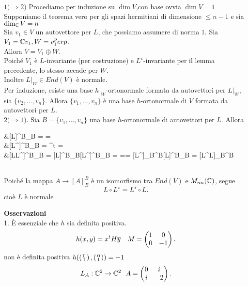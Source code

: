 \documentclass[12px]{article}
\begin{document}
	\begin{dimo}
		$1) \Rightarrow  2)$ Procediamo per induzione su $\dim V$,con base ovvia $\dim V = 1$ \\
		Supponiamo il teorema vero per gli spazi hermitiani di dimensione $\leq n-1$ e sia  $\dim_{\mathbb{C}} V = n$\\
		Sia  $v_1\in V$ un autovettore per $L$, che possiamo assumere di norma  $1$. Sia $V_1 = \mathbb{C} v_1, W = v_1^perp$.\\
		Allora $V = V_1 \oplus W$.\\
		Poiché $V_1$ è $L$-invariante (per costruzione) e $L^\star$-invariante per il lemma precedente, lo stesso accade per  $W$.\\
		Inoltre $L|_W\in End(V)$ è normale.\\
		Per induzione, esiste una base $h|_W$-ortonormale formata da autovettori per $L|_W$, sia $\{v_2,\ldots,v_n\}.$ Allora $\{v_1,\ldots,v_n\}$ è una base $h$-ortonormale di $V$ formata da autovettori per $L$.\\
		$2) \Rightarrow 1)$. Sia $B = \{v_1,\ldots,v_n\}$ una base $h$-ortonormale di autovettori per $L$. Allora\\
		\begin{aligned}
			\hspace{80px}&[L]^B_B = \bigwedge = \\
			    &[L^\star]^B_B = ^t = \overline{\bigwedge}\\
			    &[L\circ L^\star]^B_B = [L]^B_B[L^\star]^B_B = \bigwedge\overline{\bigwedge}=\overline{\bigwedge}\bigwedge = [L^\star]_B^B[L]^B_B = [L^\star \circ L]_B^B
		 \end{aligned} \\
		 Poiché la mappa $A \rightarrow [A]^B_B$ è un isomorfismo tra
		 $End(V)$ e $M_{nn}(\mathbb{C})$, segue 
		 \[
		 L\circ L^\star = L^\star \circ L
		 .\] 
		 cioè $L$ è normale
	\end{dimo}
	\textbf{Osservazioni}\\
	1. È essenziale che $h$ sia definita positiva.\\
	\[
	 h(x,y) = x^tH\overline{y} \ \ \ M = \begin{pmatrix}1&0\\0&-1\end{pmatrix}
	.\] 
	non è definita positiva $h(\left(\begin{smallmatrix}0\\1\end{smallmatrix}\right),\left(\begin{smallmatrix}0\\1\end{smallmatrix}\right)) = -1$
	\[
		L_A:\mathbb{C}^2 \rightarrow\mathbb{C}^2 \ \ A = \begin{pmatrix}0&i\\i & -2\end{pmatrix}
	.\] 
\end{document}
